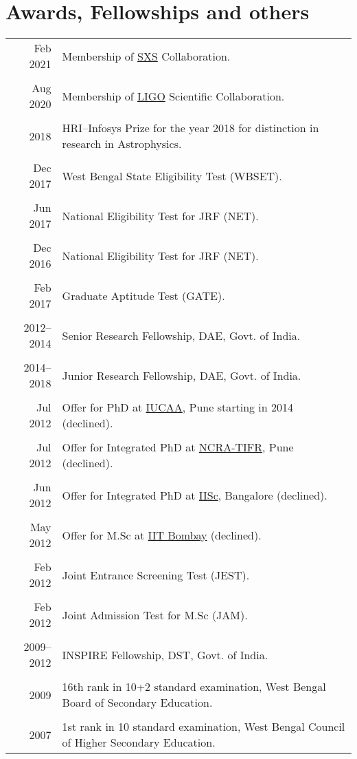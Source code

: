 \documentclass[12pt]{article}
\begin{document}
\section{Awards, Fellowships and others}
\begin{longtable}{rp{14cm}}
Feb 2021 & Membership of \href{https://www.black-holes.org/}{SXS} Collaboration.\\\\
Aug 2020 & Membership of \href{https://www.ligo.org/}{LIGO} Scientific Collaboration.\\\\
2018 & HRI–Infosys Prize for the year 2018 for distinction in research in Astrophysics.\\\\
Dec 2017 & West Bengal State Eligibility Test (WBSET).\\\\
Jun 2017 & National Eligibility Test for JRF (NET).\\\\
Dec 2016 & National Eligibility Test for JRF (NET).\\\\
Feb 2017 & Graduate Aptitude Test (GATE).\\\\
2012--2014 & Senior Research Fellowship, DAE, Govt. of India.\\\\
2014--2018 & Junior Research Fellowship, DAE, Govt. of India.\\\\
Jul 2012 & Offer for PhD at \href{https://www.iucaa.in/}{IUCAA}, Pune starting in 2014 (declined).\\\\
Jul 2012 & Offer for Integrated PhD at \href{http://www.ncra.tifr.res.in/ncra/main}{NCRA-TIFR}, Pune (declined).\\\\
Jun 2012 & Offer for Integrated PhD at \href{https://www.iisc.ac.in/}{IISc}, Bangalore (declined).\\\\
May 2012 & Offer for M.Sc at \href{http://www.iitb.ac.in/}{IIT Bombay} (declined).\\\\
Feb 2012 & Joint Entrance Screening Test (JEST).\\\\
Feb 2012 & Joint Admission Test for M.Sc (JAM).\\\\
2009--2012 & INSPIRE Fellowship, DST, Govt. of India.\\\\
2009 & {16th} rank in 10+2 standard examination, West Bengal Board of Secondary Education.\\\\
2007 & {1st} rank in 10 standard examination, West Bengal Council of Higher Secondary Education.
\end{longtable}
\end{document}
